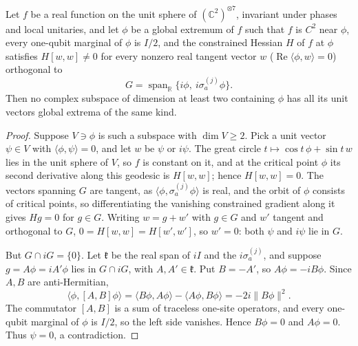 \begin{lemma}\label{lem:seven-flat-extremal-planes}
Let $f$ be a real function on the unit sphere of $(\mathbb C^2)^{\otimes7}$, invariant under phases and local unitaries,
and let $\phi$ be a global extremum of $f$ such that $f$ is $C^2$ near $\phi$, every one-qubit marginal of $\phi$ is $I/2$,
and the constrained Hessian $H$ of $f$ at $\phi$ satisfies $H[w,w]\ne0$ for every nonzero real tangent vector
$w$ ($\operatorname{Re}\langle\phi,w\rangle=0$) orthogonal to
\[
 G=\operatorname{span}_{\mathbb R}\{i\phi,\ i\sigma_a^{(j)}\phi\}.
\]
Then no complex subspace of dimension at least two containing $\phi$ has all its unit vectors global extrema of the
same kind.
\end{lemma}
\begin{proof}
Suppose $V\ni\phi$ is such a subspace with $\dim V\ge2$. Pick a unit vector $\psi\in V$ with $\langle\phi,\psi\rangle=0$, and let
$w$ be $\psi$ or $i\psi$. The great circle $t\mapsto\cos t\,\phi+\sin t\,w$ lies in the unit sphere of $V$, so $f$ is
constant on it, and at the critical point $\phi$ its second derivative along this geodesic is $H[w,w]$; hence $H[w,w]=0$.
The vectors spanning $G$ are tangent, as $\langle\phi,\sigma_a^{(j)}\phi\rangle$ is real, and the orbit of $\phi$ consists of
critical points, so differentiating the vanishing constrained gradient along it gives $Hg=0$ for $g\in G$. Writing $w=g+w'$
with $g\in G$ and $w'$ tangent and orthogonal to $G$, $0=H[w,w]=H[w',w']$, so $w'=0$: both $\psi$ and $i\psi$ lie in $G$.

But $G\cap iG=\{0\}$. Let $\mathfrak k$ be the real span of $iI$ and the $i\sigma_a^{(j)}$, and suppose $g=A\phi=iA'\phi$ lies in $G\cap iG$, with
$A,A'\in\mathfrak k$. Put $B=-A'$, so $A\phi=-iB\phi$. Since $A,B$ are anti-Hermitian,
\[
 \langle\phi,[A,B]\phi\rangle=\langle B\phi,A\phi\rangle-\langle A\phi,B\phi\rangle=-2i\|B\phi\|^2 .
\]
The commutator $[A,B]$ is a sum of traceless one-site operators, and every one-qubit marginal of $\phi$ is $I/2$, so the left
side vanishes. Hence $B\phi=0$ and $A\phi=0$. Thus $\psi=0$, a contradiction.
\end{proof}

